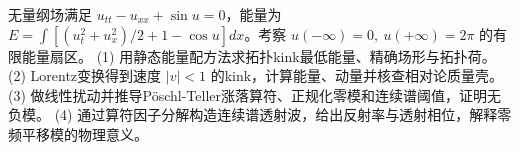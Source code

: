 无量纲场满足 \(u_{tt}-u_{xx}+\sin u=0\)，能量为 \(E=\int[(u_t^2+u_x^2)/2+1-\cos u]dx\)。考察 \(u(-\infty)=0,\ u(+\infty)=2\pi\) 的有限能量扇区。
(1) 用静态能量配方法求拓扑kink最低能量、精确场形与拓扑荷。
(2) Lorentz变换得到速度 \(|v|<1\) 的kink，计算能量、动量并核查相对论质量壳。
(3) 做线性扰动并推导Pöschl-Teller涨落算符、正规化零模和连续谱阈值，证明无负模。
(4) 通过算符因子分解构造连续谱透射波，给出反射率与透射相位，解释零频平移模的物理意义。
